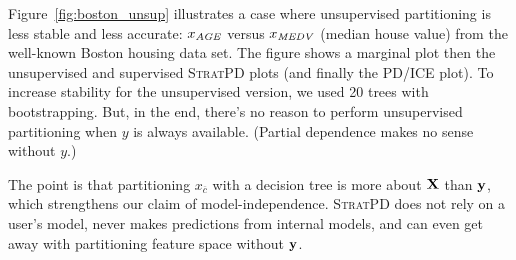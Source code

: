 \documentclass[12pt]{article}
\newcommand{\figref}[1]{Figure~\ref{#1}}
\newcommand{\spd}{\fontfamily{cmr}\textsc{\small StratPD}}
\newcommand{\xnc}{$x_{\overline{c}}$}
\begin{document}
\figref{fig:boston_unsup} illustrates a case where unsupervised partitioning is less stable and less accurate: $x_{\it AGE}$ versus $x_{\it MEDV}$ (median house value) from the well-known Boston housing data set. The figure shows a marginal plot then the unsupervised and supervised \spd{} plots (and finally the PD/ICE plot). To increase stability for the unsupervised version, we used 20 trees with bootstrapping. But, in the end, there's no reason to perform unsupervised partitioning when $y$ is always available. (Partial dependence makes no sense without $y$.) 

The point is that partitioning \xnc{}  with a decision tree is more about $\bf X$ than $\bf y$, which strengthens our claim of model-independence. \spd{} does not rely on a user's model, never makes predictions from internal models, and can even get away with partitioning feature space without $\bf y$.
\end{document}
